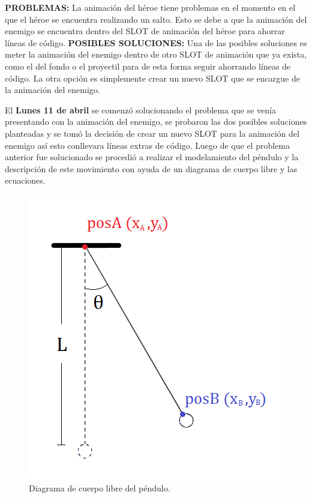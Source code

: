\documentclass{article}
\begin{document}
 \textbf{PROBLEMAS:} La animación del héroe tiene problemas en el momento en el que el héroe se encuentra realizando un salto. Esto se debe a que la animación del enemigo se encuentra dentro del SLOT de animación del héroe para ahorrar líneas de código.
 \newline
 \textbf{POSIBLES SOLUCIONES: }Una de las posibles soluciones es meter la animación del enemigo dentro de otro SLOT de animación que ya exista, como el del fondo o el proyectil para de esta forma seguir ahorrando líneas de código. La otra opción es simplemente crear un nuevo SLOT que se encargue de la animación del enemigo.
 \newline
 

El \textbf{Lunes 11 de abril} se comenzó solucionando el problema que se venía presentando con la animación del enemigo, se probaron las dos posibles soluciones planteadas y se tomó la decisión de crear un nuevo SLOT para la animación del enemigo así esto conllevara líneas extras de código. Luego de que el problema anterior fue solucionado se procedió a realizar el modelamiento del péndulo y la descripción de este movimiento con ayuda de un diagrama de cuerpo libre y las ecuaciones. 

\begin{figure}[h]
\includegraphics[scale=0.6]{Images/diagramapendulo.png}
\centering
\caption{Diagrama de cuerpo libre del péndulo.}
\label{fig:diagrama}
\end{figure}
\end{document}
